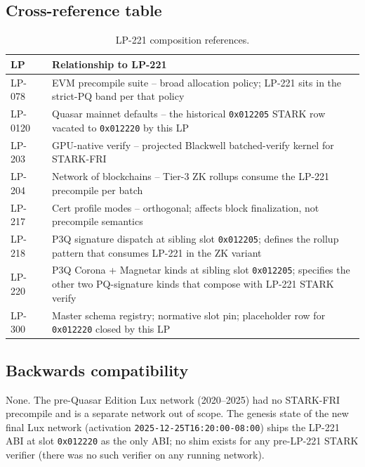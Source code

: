 \subsection{Cross-reference table}

\begin{table}[h]
\centering
\small
\begin{tabular}{@{}lp{9.5cm}@{}}
\toprule
\textbf{LP} & \textbf{Relationship to LP-221} \\
\midrule
LP-078~\cite{lp078}  & EVM precompile suite -- broad allocation policy; LP-221 sits in the strict-PQ band per that policy \\
LP-0120~\cite{lp120} & Quasar mainnet defaults -- the historical \texttt{0x012205} STARK row vacated to \texttt{0x012220} by this LP \\
LP-203~\cite{lp203}  & GPU-native verify -- projected Blackwell batched-verify kernel for STARK-FRI \\
LP-204~\cite{lp204}  & Network of blockchains -- Tier-3 ZK rollups consume the LP-221 precompile per batch \\
LP-217~\cite{lp217}  & Cert profile modes -- orthogonal; affects block finalization, not precompile semantics \\
LP-218~\cite{lp218}  & P3Q signature dispatch at sibling slot \texttt{0x012205}; defines the rollup pattern that consumes LP-221 in the ZK variant \\
LP-220~\cite{lp220}  & P3Q Corona + Magnetar kinds at sibling slot \texttt{0x012205}; specifies the other two PQ-signature kinds that compose with LP-221 STARK verify \\
LP-300~\cite{lp300}  & Master schema registry; normative slot pin; placeholder row for \texttt{0x012220} closed by this LP \\
\bottomrule
\end{tabular}
\caption{LP-221 composition references.}
\label{tab:composition-refs}
\end{table}

\subsection{Backwards compatibility}

None. The pre-Quasar Edition Lux network (2020--2025) had no
STARK-FRI precompile and is a separate network out of scope. The
genesis state of the new final Lux network (activation
\texttt{2025-12-25T16:20:00-08:00}) ships the LP-221 ABI at slot
\texttt{0x012220} as the only ABI; no shim exists for any
pre-LP-221 STARK verifier (there was no such verifier on any
running network).

